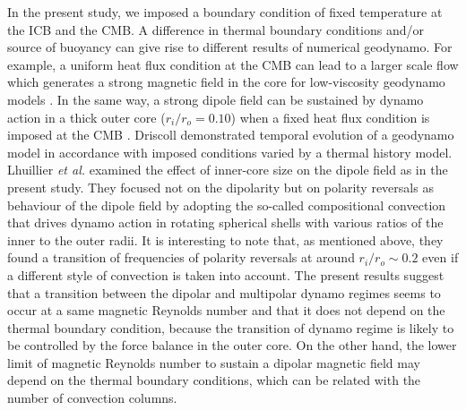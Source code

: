 {\color{blue}
}
{\color{red}
In the present study, we imposed a boundary condition of fixed temperature at the ICB and the CMB.
A difference in thermal boundary conditions and/or source of buoyancy can give rise to different results of numerical geodynamo.
For example, a uniform heat flux condition at the CMB can lead to a larger scale flow which generates a strong magnetic field in the core for low-viscosity geodynamo models \cite{Sakuraba:2009}.
}
{\color{red}
In the same way, a strong dipole field can be sustained by dynamo action in a thick outer core ($r_i / r_o = 0.10$) when a fixed heat flux condition is imposed at the CMB \cite{Hori:2010}.
Driscoll  demonstrated temporal evolution of a geodynamo model in accordance with imposed conditions varied by a thermal history model.
Lhuillier {\it et al.}  examined the effect of inner-core size on the dipole field as in the present study.
They focused not on the dipolarity but on polarity reversals as behaviour of the dipole field by adopting the so-called compositional convection that drives dynamo action in rotating spherical shells with various ratios of the inner to the outer radii.
It is interesting to note that, as mentioned above, they found a transition of frequencies of polarity reversals at around $r_i / r_o \sim 0.2$ even if a different style of convection is taken into account.
}
{\color{red}
The present results suggest that a transition between the dipolar and multipolar dynamo regimes seems to occur at a same magnetic Reynolds number and that it does not depend on the thermal boundary condition, because the transition of dynamo regime is likely to be controlled by the force balance in the outer core.
}
{\color{blue}
On the other hand, the lower limit of magnetic Reynolds number to sustain a dipolar magnetic field may depend on the thermal boundary conditions, which can be related with the number of convection columns.
}
